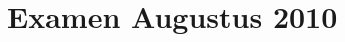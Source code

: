 \documentclass[lineaire_algebra_oplossingen.tex]{subfiles}
\begin{document}
\section{Examen Augustus 2010}
\end{document}
